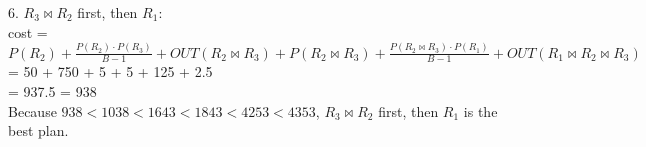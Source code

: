 \documentclass[letterpaper,11pt]{article}
\begin{document}
{	6. \(R_3 \Join R_2\) first, then \(R_1\): \\
	cost = \(P(R_2) + \frac{P(R_2) \cdot P(R_3)}{B - 1} + OUT(R_2 \Join R_3) + 
	P(R_2 \Join R_3) + \frac{P(R_2 \Join R_3) \cdot P(R_1)}{B - 1} + OUT(R_1 \Join R_2 \Join R_3)\) \\
	= 50 + 750 + 5 + 5 + 125 + 2.5\\
	= 937.5 = 938\\

	Because \(938 < 1038 < 1643 < 1843 < 4253 < 4353\), \(R_3 \Join R_2\) first, then \(R_1\) is the best plan. 
	

}
\end{document}
